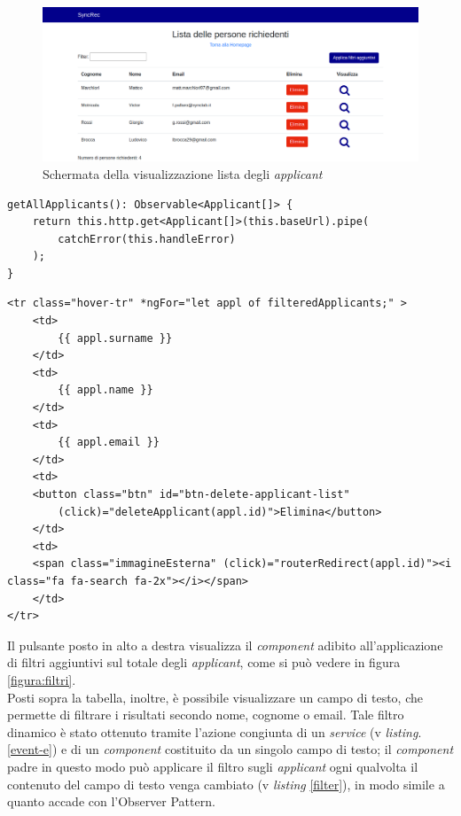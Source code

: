 \vspace{0.5em}
\begin{figure}[!h] 
	\centering 
	\includegraphics[width=1\columnwidth]{immagini/svil/lista} 
	\caption{Schermata della visualizzazione lista degli \textit{applicant}}
	\label{figura:lista}
\end{figure}

\begin{lstlisting}[label=get-applicant,caption=Funzione del service che effettua la chiamata GET]
getAllApplicants(): Observable<Applicant[]> {
	return this.http.get<Applicant[]>(this.baseUrl).pipe(
		catchError(this.handleError)
	);
}
\end{lstlisting} 

\begin{lstlisting}[label=ng-for,caption=Visualizzazione degli applicant nel codice HTML]
<tr class="hover-tr" *ngFor="let appl of filteredApplicants;" >
	<td>
		{{ appl.surname }}
	</td>
	<td>
		{{ appl.name }}
	</td>
	<td>
		{{ appl.email }}
	</td>
	<td>
	<button class="btn" id="btn-delete-applicant-list"
		(click)="deleteApplicant(appl.id)">Elimina</button>
	</td>
	<td>
	<span class="immagineEsterna" (click)="routerRedirect(appl.id)"><i class="fa fa-search fa-2x"></i></span>
	</td>
</tr>
\end{lstlisting} 

Il pulsante posto in alto a destra visualizza il \textit{component} adibito all'applicazione di filtri aggiuntivi sul totale degli \textit{applicant}, come si può vedere in figura \ref{figura:filtri}.\\
Posti sopra la tabella, inoltre, è possibile visualizzare un campo di testo, che permette di filtrare i risultati secondo nome, cognome o email. Tale filtro dinamico è stato ottenuto tramite l'azione congiunta di un \textit{service} (v \textit{listing}. \ref{event-e}) e di un \textit{component} costituito da un singolo campo di testo; il \textit{component} padre in questo modo può applicare il filtro sugli \textit{applicant} ogni qualvolta il contenuto del campo di testo venga cambiato (v \textit{listing} \ref{filter}), in modo simile a quanto accade con l'\gls{Observer Pattern}.

